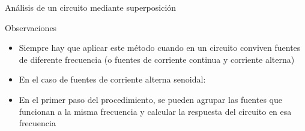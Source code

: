 \documentclass[aspectratio=169, usenames,svgnames,dvipsnames]{beamer}
\begin{document}
\begin{frame}{Análisis de un circuito mediante superposición}

    \begin{block}{Observaciones}
    \begin{itemize}
        \vspace{2mm}
        \item \alert{Siempre} hay que \alert{aplicar este método} cuando en un circuito conviven \alert{fuentes de diferente frecuencia} (o fuentes de corriente continua y corriente alterna)

        \vspace{2mm}
        \item En el caso de fuentes de \alert{corriente alterna senoidal}:

        \vspace{1mm}
        
        \vspace{2mm}
        \item En el primer paso del procedimiento, se pueden \alert{agrupar las fuentes que funcionan a la misma frecuencia} y calcular la respuesta del circuito en esa frecuencia

        \vspace{1mm}
    \end{itemize}
    \end{block}
\end{frame}

\end{document}

